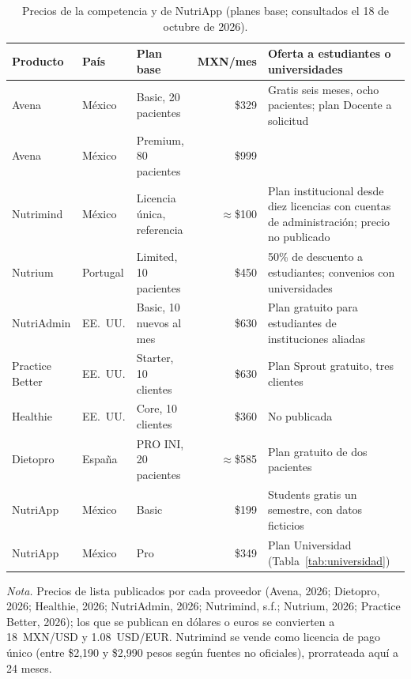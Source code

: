 \documentclass[12pt, a4paper]{article}
\begin{document}
\begin{table}[!htbp]
  \centering
  \caption{Precios de la competencia y de NutriApp (planes base; consultados
  el 18 de octubre de 2026).}
  \label{tab:competencia}
  \footnotesize
  \begin{tabularx}{\textwidth}{l l l r X}
    \toprule
    \textbf{Producto} & \textbf{País} & \textbf{Plan base} & \textbf{MXN/mes} & \textbf{Oferta a estudiantes o universidades} \\
    \midrule
    Avena & México & Basic, 20 pacientes & \$329 & Gratis seis meses, ocho pacientes; plan Docente a solicitud \\
    Avena & México & Premium, 80 pacientes & \$999 & \\
    Nutrimind & México & Licencia única, referencia & $\approx$\$100 & Plan institucional desde diez licencias con cuentas de administración; precio no publicado \\
    Nutrium & Portugal & Limited, 10 pacientes & \$450 & 50\% de descuento a estudiantes; convenios con universidades \\
    NutriAdmin & EE.~UU. & Basic, 10 nuevos al mes & \$630 & Plan gratuito para estudiantes de instituciones aliadas \\
    Practice Better & EE.~UU. & Starter, 10 clientes & \$630 & Plan Sprout gratuito, tres clientes \\
    Healthie & EE.~UU. & Core, 10 clientes & \$360 & No publicada \\
    Dietopro & España & PRO INI, 20 pacientes & $\approx$\$585 & Plan gratuito de dos pacientes \\
    \midrule
    NutriApp & México & Basic & \$199 & Students gratis un semestre, con datos ficticios \\
    NutriApp & México & Pro & \$349 & Plan Universidad (Tabla~\ref{tab:universidad}) \\
    \bottomrule
  \end{tabularx}
  \begin{flushleft}
    \small\textit{Nota.} Precios de lista publicados por cada proveedor
    (Avena, 2026; Dietopro, 2026; Healthie, 2026; NutriAdmin, 2026;
    Nutrimind, s.f.; Nutrium, 2026; Practice Better, 2026); los que se
    publican en dólares o euros se convierten a 18~MXN/USD y 1.08~USD/EUR.
    Nutrimind se vende como licencia de pago único (entre \$2,190 y
    \$2,990 pesos según fuentes no oficiales), prorrateada aquí a 24 meses.
  \end{flushleft}
\end{table}
 
\end{document}
